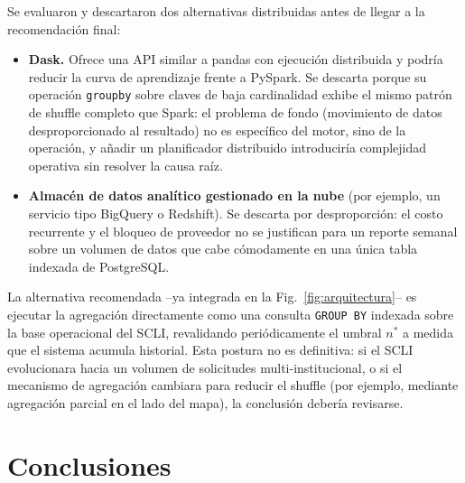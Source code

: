 \documentclass[10pt,journal]{IEEEtran}
\begin{document}
Se evaluaron y descartaron dos alternativas distribuidas antes de llegar a la
recomendaci\'on final:
\begin{itemize}
\item \textbf{Dask.} Ofrece una API similar a pandas con ejecuci\'on
distribuida y podr\'ia reducir la curva de aprendizaje frente a PySpark. Se
descarta porque su operaci\'on \texttt{groupby} sobre claves de baja
cardinalidad exhibe el mismo patr\'on de shuffle completo que Spark: el
problema de fondo (movimiento de datos desproporcionado al resultado) no es
espec\'ifico del motor, sino de la operaci\'on, y a\~nadir un planificador
distribuido introducir\'ia complejidad operativa sin resolver la causa ra\'iz.
\item \textbf{Almac\'en de datos anal\'itico gestionado en la nube} (por
ejemplo, un servicio tipo BigQuery o Redshift). Se descarta por
desproporci\'on: el costo recurrente y el bloqueo de proveedor no se
justifican para un reporte semanal sobre un volumen de datos que cabe
c\'omodamente en una \'unica tabla indexada de PostgreSQL.
\end{itemize}
La alternativa recomendada --ya integrada en la Fig.~\ref{fig:arquitectura}--
es ejecutar la agregaci\'on directamente como una consulta \texttt{GROUP BY}
indexada sobre la base operacional del SCLI, revalidando peri\'odicamente el
umbral $n^{*}$ a medida que el sistema acumula historial. Esta postura no es
definitiva: si el SCLI evolucionara hacia un volumen de solicitudes
multi-institucional, o si el mecanismo de agregaci\'on cambiara para reducir
el shuffle (por ejemplo, mediante agregaci\'on parcial en el lado del mapa),
la conclusi\'on deber\'ia revisarse.

\section{Conclusiones}
\label{sec:conclusiones}
\end{document}
